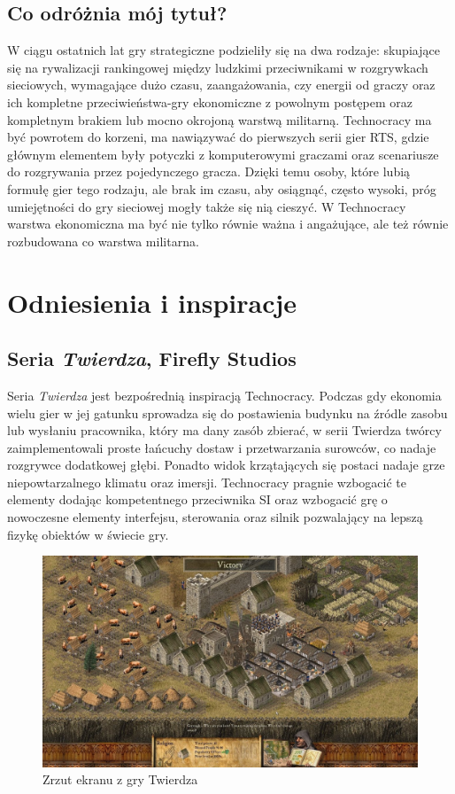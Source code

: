 \documentclass[a4paper]{scrreprt}
\def \GameTiTle{Technocracy}
\begin{document}
\section{Co odróżnia mój tytuł?}
W ciągu ostatnich lat gry strategiczne podzieliły się na dwa rodzaje: skupiające się na rywalizacji rankingowej między ludzkimi przeciwnikami w rozgrywkach sieciowych, wymagające dużo czasu, zaangażowania, czy energii od graczy oraz ich kompletne przeciwieństwa-gry ekonomiczne z powolnym postępem oraz kompletnym brakiem lub mocno okrojoną warstwą militarną.
\GameTiTle{} ma być powrotem do korzeni, ma nawiązywać do pierwszych serii gier RTS, gdzie głównym elementem były potyczki z komputerowymi graczami oraz scenariusze do rozgrywania przez pojedynczego gracza. Dzięki temu osoby, które lubią formułę gier tego rodzaju, ale brak im czasu, aby osiągnąć, często wysoki, próg umiejętności do gry sieciowej mogły także się nią cieszyć. 
W \GameTiTle{} warstwa ekonomiczna ma być nie tylko równie ważna i angażujące, ale też równie rozbudowana co warstwa militarna.


\chapter{Odniesienia i inspiracje} 

\section{Seria \emph{Twierdza}, Firefly Studios}
Seria \emph{Twierdza} jest bezpośrednią 
inspiracją \GameTiTle{}. Podczas gdy ekonomia wielu gier w jej gatunku sprowadza się do postawienia budynku na źródle zasobu lub wysłaniu pracownika, który ma dany zasób zbierać, w serii Twierdza twórcy zaimplementowali proste łańcuchy dostaw i przetwarzania surowców, co nadaje rozgrywce dodatkowej głębi. Ponadto widok krzątających się postaci nadaje grze niepowtarzalnego klimatu oraz imersji. \GameTiTle{} pragnie wzbogacić te elementy dodając kompetentnego przeciwnika SI oraz wzbogacić grę o nowoczesne elementy interfejsu, sterowania oraz silnik pozwalający na lepszą fizykę obiektów w świecie gry.

\begin{figure}[hb]
\centering
\includegraphics[width=1\textwidth]{stronghold2.jpg}
\caption{\label{} Zrzut ekranu z gry Twierdza}
\end{figure}
\newpage
\end{document}
